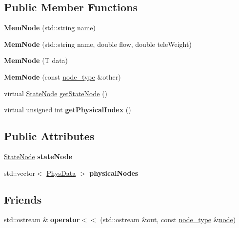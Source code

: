 \subsection*{Public Member Functions}
\begin{DoxyCompactItemize}
\item 
\mbox{\label{classMemNode_aaa35e49113cdb84e1b34029adb559b7f}} 
{\bfseries Mem\+Node} (std\+::string name)
\item 
\mbox{\label{classMemNode_a1d3c46c555bc442d7e4f6d8dfac7c271}} 
{\bfseries Mem\+Node} (std\+::string name, double flow, double tele\+Weight)
\item 
\mbox{\label{classMemNode_a2c73eebd437d983d3e3ea2ed810bb842}} 
{\bfseries Mem\+Node} (T data)
\item 
\mbox{\label{classMemNode_aa96e5cbfb42fa6a4115942fb4d15d8e8}} 
{\bfseries Mem\+Node} (const \mbox{\hyperlink{classNode}{node\+\_\+type}} \&other)
\item 
virtual \mbox{\hyperlink{structStateNode}{State\+Node}} \mbox{\hyperlink{classMemNode_a60aac298830b3ad469b8fae1ae21a1d0}{get\+State\+Node}} ()
\item 
\mbox{\label{classMemNode_a6221c557ce90d958b61bf56a75312769}} 
virtual unsigned int {\bfseries get\+Physical\+Index} ()
\end{DoxyCompactItemize}
\subsection*{Public Attributes}
\begin{DoxyCompactItemize}
\item 
\mbox{\label{classMemNode_ac6bf752f7fef909113280b310efda8cc}} 
\mbox{\hyperlink{structStateNode}{State\+Node}} {\bfseries state\+Node}
\item 
\mbox{\label{classMemNode_a37887744d18e70ca204d75d51767d6b1}} 
std\+::vector$<$ \mbox{\hyperlink{structPhysData}{Phys\+Data}} $>$ {\bfseries physical\+Nodes}
\end{DoxyCompactItemize}
\subsection*{Friends}
\begin{DoxyCompactItemize}
\item 
\mbox{\label{classMemNode_adcab8ad07fc4a325f5697a520a051b7e}} 
std\+::ostream \& {\bfseries operator$<$$<$} (std\+::ostream \&out, const \mbox{\hyperlink{classNode}{node\+\_\+type}} \&\mbox{\hyperlink{structnode}{node}})
\end{DoxyCompactItemize}
